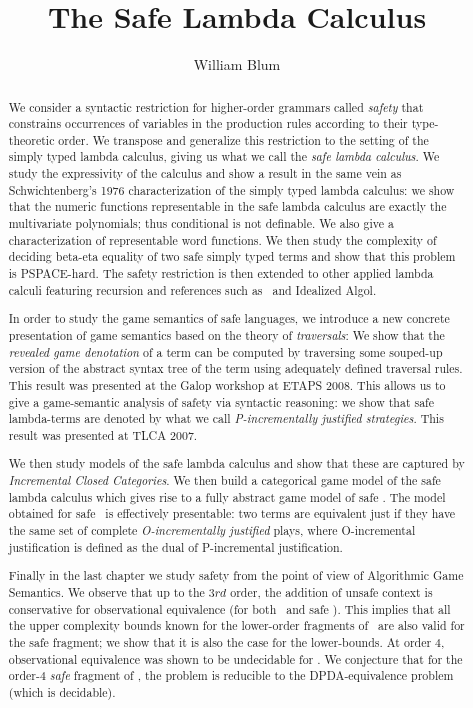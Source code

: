 \documentclass[a4paper,twoside,openright,draft]{ociamthesis}
\author{William Blum}
\title{The Safe Lambda Calculus}
\begin{document}
\maketitle

\begin{abstract}
We consider a syntactic restriction for higher-order grammars called \emph{safety}  that  constrains occurrences of variables in the production rules according to their type-theoretic order. We transpose and generalize this restriction to the setting of the simply typed lambda calculus, giving us what we call the \emph{safe lambda calculus}.  We study the expressivity of the calculus and show a result in the same vein as Schwichtenberg's 1976 characterization of the simply typed lambda calculus: we show that the numeric functions representable in the safe lambda calculus are exactly the
multivariate polynomials; thus conditional is not definable. We
also give a characterization of representable word functions.
We then study the complexity of deciding beta-eta equality of two safe simply typed terms and show that this problem is PSPACE-hard. The safety restriction is then extended to other applied lambda calculi featuring recursion and references such as \pcf\ and Idealized Algol.

In order to study the game semantics of safe languages, we introduce a new concrete presentation of game semantics based on the theory of \emph{traversals}: We show that the \emph{revealed game denotation} of a term can be computed by traversing some souped-up version of the abstract syntax tree of the term using adequately defined traversal rules. This result was presented at the Galop workshop at ETAPS 2008. This allows us to give a game-semantic analysis of safety via syntactic reasoning: we show that safe lambda-terms are denoted by what we call \emph{P-incrementally justified strategies}. This result was presented at TLCA 2007.

We then study models of the safe lambda calculus and show that these are captured by  \emph{Incremental Closed Categories}. We then build a categorical game model of the safe lambda calculus which gives rise to a fully abstract game model of safe \ialgol.
The model obtained for safe \ialgol\ is effectively presentable: two terms are equivalent just if they have the same set of complete \emph{O-incrementally justified} plays, where O-incremental justification is defined as the dual of P-incremental justification.

Finally in the last chapter we study safety from the point of view of Algorithmic Game Semantics.  We observe that up to the $3rd$ order, the addition of unsafe context is conservative for observational equivalence (for both \ialgol\ and safe \ialgol). This implies that all the upper complexity bounds known for the lower-order fragments of \ialgol\ are also valid for the safe fragment; we show that it is also the case for the lower-bounds. At order $4$, observational equivalence was shown to be undecidable for \ialgol.
We conjecture that for the order-$4$ \emph{safe} fragment of \ialgol, the problem is reducible to the DPDA-equivalence problem (which is decidable).

\end{abstract}
\end{document}
